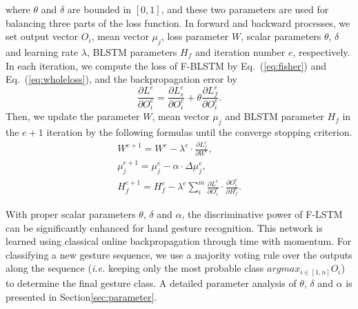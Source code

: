 \documentclass[review]{elsarticle}
\begin{document}
where $\theta$ and $\delta$ are bounded in $[0,1]$, and these two parameters are used for balancing three parts of the loss function. In forward and backward processes, we set output vector ${O_i}$, mean vector ${\mu_j}$, loss parameter $W$, scalar parameters $\theta$, $\delta$ and learning rate $\lambda$, BLSTM parameters $H_f$ and iteration number $e$, respectively. In each iteration, we compute the loss of F-BLSTM by Eq.~(\ref{eq:fisher}) and Eq.~(\ref{eq:wholeloss}), and the backpropagation error by
\begin{equation}
	\frac{{\partial {L^e}}}{{\partial O_i^e}} = \frac{{\partial L_s^e}}{{\partial O_i^e}} + \theta \frac{{\partial L_f^e}}{{\partial O_i^e}}.
	\label{eq:backerror}
\end{equation}
Then, we update the parameter $W$, mean vector $\mu_{j}$ and BLSTM parameter $H_f$ in the $e+1$ iteration by the following formulas until the converge stopping criterion.
\begin{equation}
	\begin{array}{l}
	{W^{e + 1}} = {W^e} - {\lambda ^e} \cdot \frac{{\partial L_f^e}}{{\partial {W^e}}},\\
	\mu _j^{e + 1} = \mu _j^e - \alpha  \cdot \Delta \mu _j^e,\\
	H_f^{e + 1} = H_f^e - {\lambda ^e}\sum\nolimits_i^m {\frac{{\partial {L^e}}}{{\partial O_i^e}}}  \cdot \frac{{\partial O_i^e}}{{\partial H_f^e}}.
	\end{array}
	\label{eq:parmean}
\end{equation}

With proper scalar parameters $\theta$, $\delta$ and $\alpha$, the discriminative power of F-LSTM can be significantly enhanced for hand gesture recognition. This network is learned using classical online backpropagation through time with momentum. For classifying a new gesture sequence, we use a majority voting rule over the outputs along the sequence (\emph{i.e.} keeping only the most probable class $argmax _{i \in \left[ {1,n} \right]}{O_i}$) to determine the final gesture class. A detailed parameter analysis of $\theta$, $\delta$ and $\alpha$ is presented in Section\;\ref{sec:parameter}.
\end{document}
